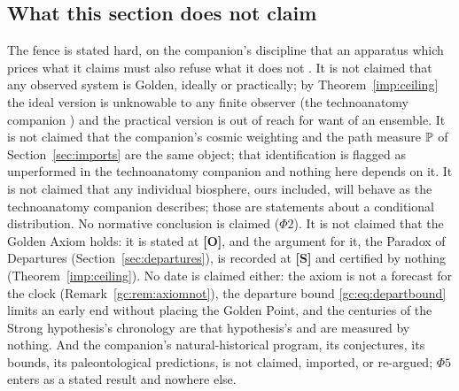 \subsection{What this section does not claim}\label{gr:sub:fence}

The fence is stated hard, on the companion's discipline that an
apparatus which prices what it claims must also refuse what it does not
\cite{AethusOptimalEarth}. It is not claimed that any observed system is Golden, ideally or
practically; by Theorem~\ref{imp:ceiling} the ideal version is
unknowable to any finite observer (the technoanatomy companion \cite{GoldenTechnoanatomy}) and
the practical version is out of reach for want of an ensemble. It is not claimed that the companion's cosmic
weighting and the path measure $\mathbb{P}$ of
Section~\ref{sec:imports} are the same object; that
identification is flagged as unperformed in
the technoanatomy companion \cite{GoldenTechnoanatomy} and nothing here depends on it. It is not
claimed that any individual biosphere, ours included, will behave as
the technoanatomy companion \cite{GoldenTechnoanatomy} describes; those are statements about a
conditional distribution. No normative conclusion is claimed
($\Phi2$). It is not claimed that the Golden Axiom holds: it is stated at
\textbf{[O]}, and the argument for it, the Paradox of Departures
(Section~\ref{sec:departures}), is recorded at \textbf{[S]} and certified
by nothing (Theorem~\ref{imp:ceiling}). No date is claimed either: the axiom is not a forecast for the clock (Remark~\ref{gc:rem:axiomnot}), the departure bound \eqref{gc:eq:departbound} limits an early end without placing the Golden Point, and the centuries of the Strong hypothesis's chronology are that hypothesis's and are measured by nothing. And the companion's natural-historical program, its
conjectures, its bounds, its paleontological predictions, is not
claimed, imported, or re-argued; $\Phi5$ enters as a stated result and
nowhere else.

